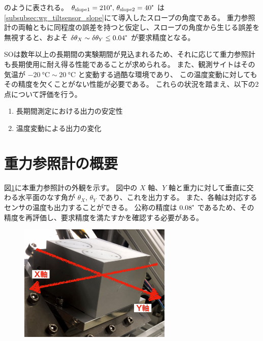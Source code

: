 \documentclass[../../main.tex]{subfiles}
\begin{document}
のように表される。
$\theta_{\mathrm{slope}1}=210\tcdegree,\,\theta_{\mathrm{slope}2}=40\tcdegree$ は\ref{subsubsec:wg_tiltsensor_slope}にて導入したスロープの角度である。
重力参照計の両軸ともに同程度の誤差を持つと仮定し、スロープの角度から生じる誤差を無視すると、およそ $\delta\theta_{X} \sim \delta\theta_{Y} \leq 0.04\tcdegree$ が要求精度となる。

SOは数年以上の長期間の実験期間が見込まれるため、それに応じて重力参照計も長期使用に耐え得る性能であることが求められる。
また、観測サイトはその気温が $\SI{-20}{\degreeCelsius} \sim \SI{20}{\degreeCelsius}$ と変動する過酷な環境であり、
この温度変動に対してもその精度を欠くことがない性能が必要である。
これらの状況を踏まえ、以下の2点について評価を行う。
\begin{enumerate}
    \item 長期間測定における出力の安定性
    \item 温度変動による出力の変化
\end{enumerate}

\section{重力参照計の概要}
図\ref{fig:tiltsensor_DSIC-2051-60}に本重力参照計の外観を示す。
図中の $X$ 軸、$Y$ 軸と重力に対して垂直に交わる水平面のなす角が $\theta_{X},\,\theta_{Y}$ であり、これを出力する。
また、各軸は対応するセンサの温度も出力することができる。
公称の精度は $0.08\tcdegree$ であるため、その精度を再評価し、要求精度を満たすかを確認する必要がある。
\begin{figure}[H]
    \centering
    \includegraphics[width=0.65\textwidth]{tiltsensor/tiltsensor_overview.pdf}
    \label{fig:tiltsensor_DSIC-2051-60}
\end{figure}
\end{document}
